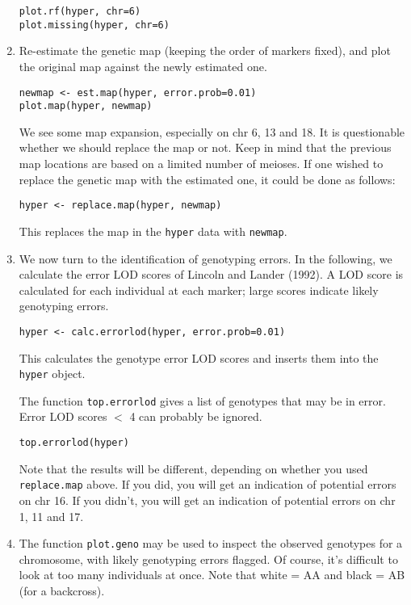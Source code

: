 \documentclass[10pt,letterpaper]{article}
\newcommand{\usercolor}{\color [named]{BlueViolet}}
\begin{document}
\begin{enumerate}
\usercolor \verb|plot.rf(hyper, chr=6)| \\
\verb|plot.missing(hyper, chr=6)| \normalcolor

\item Re-estimate the genetic map (keeping the order of markers
fixed), and plot the original map against the newly estimated one. 

\usercolor \verb|newmap <- est.map(hyper, error.prob=0.01)| \\
\verb|plot.map(hyper, newmap)| \normalcolor

We see some map expansion, especially on chr 6, 13 and 18.  It
is questionable whether we should replace the map or not.  Keep in
mind that the previous map locations are based on a limited number of
meioses.  If one wished to replace the genetic map with the estimated
one, it could be done as follows:

\usercolor
\verb|hyper <- replace.map(hyper, newmap)| \normalcolor

This replaces the map in the \verb-hyper- data with \verb-newmap-.


\item We now turn to the identification of genotyping errors.  In the
following, we calculate the error LOD scores of Lincoln and Lander
(1992).  A LOD score is calculated for each individual at each marker;
large scores indicate likely genotyping errors.

\usercolor 
\verb|hyper <- calc.errorlod(hyper, error.prob=0.01)| 
\normalcolor

This calculates the genotype error LOD scores and inserts them into
the \verb-hyper- object.

The function \verb-top.errorlod- gives a list of genotypes that may be
in error.  Error LOD scores $<$ 4 can probably be ignored.

\usercolor 
\verb|top.errorlod(hyper)| 
\normalcolor

Note that the results will be different, depending on whether you used
\verb-replace.map- above.  If you did, you will get an indication of
potential errors on chr 16.  If you didn't, you will get an
indication of potential errors on chr 1, 11 and 17.

\item The function \verb-plot.geno- may be used to inspect the
observed genotypes for a chromosome, with likely genotyping errors
flagged.  Of course, it's difficult to look at too many individuals at
once.  Note that white = AA and black = AB (for a backcross).  


\end{enumerate}
\end{document}
